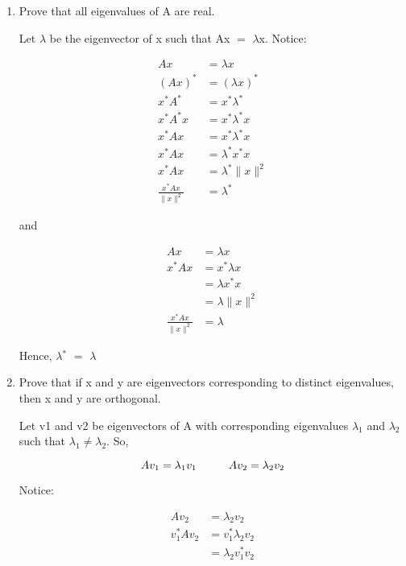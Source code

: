 \documentclass[12pt]{article}
\newcommand{\mt}[1]{\ensuremath{#1}}
\newcommand{\eql}{\mt{=} }
\newcommand{\uf}[2]{#1\mt{^{#2}}}
\newcommand{\splt}[1]{\begin{split}#1\end{split}}
\newcommand\tab[1][1cm]{\hspace*{#1}}
\begin{document}
\begin{enumerate}
  \item Prove that all eigenvalues of A are real.

Let $\lambda$ be the eigenvector of x such that Ax \eql $\lambda$x. Notice:

\begin{displaymath}
  \splt{ Ax & = \lambda x \\
  (Ax)^* & = (\lambda x)^* \\
  x^* A^* & = x^*\lambda^* \\
  x^* A^* x & = x^*\lambda^* x \\
  x^* A x & = x^*\lambda^* x \\
  x^* A x & = \lambda^* x^* x \\
  x^* A x & = \lambda^* \|x\|^2 \\
  \frac{x^* A x}{\|x\|^2} & = \lambda^* 
  }
\end{displaymath}

and

\begin{displaymath}
  \splt{ Ax & = \lambda x \\
  x^* Ax & = x^* \lambda x \\
  & = \lambda x^* x \\
  & = \lambda \|x\|^2 \\
  \frac{x^* Ax }{\|x\|^2} & = \lambda
  }
\end{displaymath}

Hence, \uf{$\lambda$}{*} \eql $\lambda$

  \item Prove that if x and y are eigenvectors corresponding to distinct eigenvalues, then x and y are orthogonal.
 
Let v1 and v2 be eigenvectors of A with corresponding eigenvalues $\lambda_1$ and $\lambda_2$ such that $\lambda_1 \neq \lambda_2$. So,

\begin{displaymath}
  Av_1 \eql \lambda_1v_1 \tab Av_2 \eql \lambda_2 v_2
\end{displaymath}

Notice:

\begin{displaymath}
  \splt{ Av_2 & = \lambda_2 v_2 \\
  v_1^* Av_2 & = v_1^* \lambda_2 v_2 \\
  & = \lambda_2 v_1^* v_2 \\
  }
\end{displaymath}


\end{enumerate}
\end{document}
